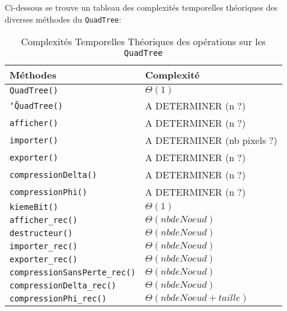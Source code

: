 \documentclass{article}
\newcommand{\info}{\texttt}
\newcommand{\qt}{\info{QuadTree}}
\begin{document}
        Ci-dessous se trouve un tableau des complexités temporelles théoriques des diverses méthodes du \qt :
        \begin{table}[H]
        	\centering
        	\label{ComplexiteTheo}
        	\begin{tabular}{|l|l|}
        		\hline
        		\rowcolor[HTML]{C0C0C0} 
        		{\color[HTML]{333333} \textbf{Méthodes}} & \textbf{Complexité} \\ \hline
        		\info{QuadTree()}                                 &  $\Theta(1)$                   \\ \hline
        		\info{\char`\~QuadTree()}                                &  A DETERMINER (n ?)                   \\ \hline
        		\info{afficher()}                                &  A DETERMINER (n ?)                   \\ \hline
        		\info{importer()}                                 &  A DETERMINER (nb pixels ?)                   \\ \hline
        		\info{exporter()}                               &  A DETERMINER (n ?)                   \\ \hline
        		\info{compressionDelta()}                                &  A DETERMINER (n ?)                   \\ \hline
        		\info{compressionPhi()}                                 &  A DETERMINER (n ?)                   \\ \hline
        		\info{kiemeBit()}                                 &  $\Theta(1)$                   \\ \hline
        		\info{afficher_rec()}                                 &  $\Theta(nb de Noeud)$                   \\ \hline
        		\info{destructeur()}                                 &  $\Theta(nb de Noeud)$                   \\ \hline
        		\info{importer_rec()}                                 &  $\Theta(nb de Noeud)$                   \\ \hline
        		\info{exporter_rec()}                                 &  $\Theta(nb de Noeud)$                   \\ \hline
        		\info{compressionSansPerte_rec()}                                 &  $\Theta(nb de Noeud)$                   \\ \hline
        		\info{compressionDelta_rec()}                                 &  $\Theta(nb de Noeud)$                   \\ \hline
        		\info{compressionPhi_rec()}                                 &  $\Theta(nb de Noeud + taille)$                   \\ \hline
        	\end{tabular}
        	\caption{Complexités Temporelles Théoriques des opérations sur les \qt}
        \end{table}
        
\end{document}
